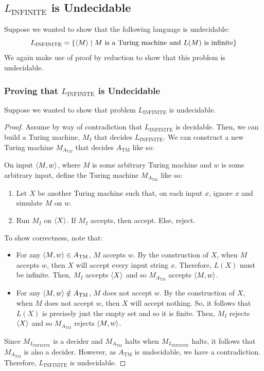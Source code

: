\documentclass[letterpaper]{article}
\begin{document}
\subsection{\texorpdfstring{$L_{\text{INFINITE}}$}{} is Undecidable}
Suppose we wanted to show that the following language is undecidable: 
\[L_{\text{INFINITE}} = \{\langle M \rangle \mid M \text{ is a Turing machine and } L(M) \text{ is infinite}\}\]
We again make use of proof by reduction to show that this problem is undecidable.

\subsubsection{Proving that \texorpdfstring{$L_{\text{INFINITE}}$}{} is Undecidable}
Suppose we wanted to show that problem $L_{\text{INFINITE}}$ is undecidable. 
\begin{mdframed}[]
    \begin{proof}
        Assume by way of contradiction that $L_{\text{INFINITE}}$ is decidable. Then, we can build a Turing machine, $M_{I}$ that decides $L_{\text{INFINITE}}$. We can construct a new Turing machine $M_{A_{\text{TM}}}$ that decides $A_{\text{TM}}$ like so:
        \begin{mdframed}[]
            On input $\langle M, w \rangle$, where $M$ is some arbitrary Turing machine and $w$ is some arbitrary input, define the Turing machine $M_{A_{\text{TM}}}$ like so: 
            \begin{enumerate}
                \item Let $X$ be another Turing machine such that, on each input $x$, ignore $x$ and simulate $M$ on $w$. 
                \item Run $M_{I}$ on $\langle X \rangle$. If $M_{I}$ accepts, then accept. Else, reject.
            \end{enumerate}
        \end{mdframed}
        To show correctness, note that: 
        \begin{itemize}
            \item For any $\langle M, w \rangle \in A_{\text{TM}}$, $M$ accepts $w$. By the construction of $X$, when $M$ accepts $w$, then $X$ will accept every input string $x$. Therefore, $L(X)$ must be infinite. Then, $M_{I}$ accepts $\langle X \rangle$ and so $M_{A_{\text{TM}}}$ accepts $\langle M, w \rangle$. 
            \item For any $\langle M, w \rangle \notin A_{\text{TM}}$, $M$ does not accept $w$. By the construction of $X$, when $M$ does not accept $w$, then $X$ will accept nothing. So, it follows that $L(X)$ is precisely just the empty set and so it is finite. Then, $M_{I}$ rejects $\langle X \rangle$ and so $M_{A_{\text{TM}}}$ rejects $\langle M, w \rangle$. 
        \end{itemize}
        Since $M_{L_{\text{INFINITE}}}$ is a decider and $M_{A_{\text{TM}}}$ halts when $M_{L_{\text{INFINITE}}}$ halts, it follows that $M_{A_{\text{TM}}}$ is also a decider. However, as $A_{\text{TM}}$ is undecidable, we have a contradiction. Therefore, $L_{\text{INFINITE}}$ is undecidable. 
    \end{proof}
\end{mdframed}
\end{document}
